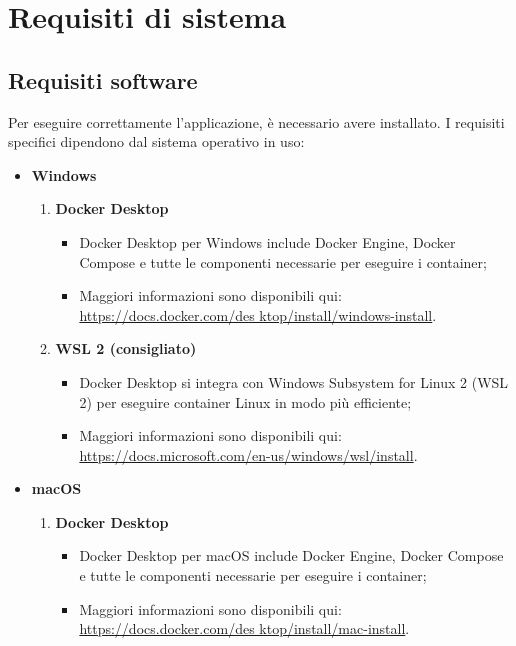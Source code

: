 \section{Requisiti di sistema}

\subsection{Requisiti software}
\par Per eseguire correttamente l'applicazione, è necessario avere  installato. I requisiti specifici dipendono dal sistema operativo in uso:
\begin{itemize}
  \item \textbf{Windows}
  \begin{enumerate}
    \item \textbf{Docker Desktop}
    \begin{itemize}
      \item Docker Desktop per Windows include Docker Engine, Docker Compose e tutte le componenti necessarie per eseguire i container;
      \item Maggiori informazioni sono disponibili qui: \href{https://docs.docker.com/desktop/install/windows-install}{https://docs.docker.com/des\- ktop/install/windows-install}.
    \end{itemize}
    \item \textbf{WSL 2 (consigliato)}
    \begin{itemize}
      \item Docker Desktop si integra con Windows Subsystem for Linux 2 (WSL 2) per eseguire container Linux in modo più efficiente;
      \item Maggiori informazioni sono disponibili qui: \href{https://docs.microsoft.com/en-us/windows/wsl/install}{https://docs.microsoft.com/en-us/windows/wsl/install}.
    \end{itemize}
  \end{enumerate}
  \item \textbf{macOS}
  \begin{enumerate}
    \item \textbf{Docker Desktop}
    \begin{itemize}
      \item Docker Desktop per macOS include Docker Engine, Docker Compose e tutte le componenti necessarie per eseguire i container;
      \item Maggiori informazioni sono disponibili qui: \href{https://docs.docker.com/desktop/install/mac-install}{https://docs.docker.com/des\- ktop/install/mac-install}.

\end{itemize}
\end{enumerate}
\end{itemize}
